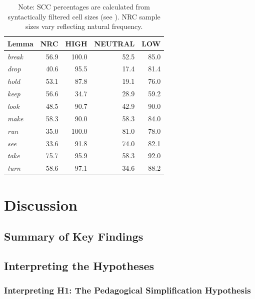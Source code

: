 \documentclass[11pt,a4paper]{article}
\begin{document}
\blindtext

\begin{table}[H]
\centering
\caption[Lemma-Level Idiomaticity]{Lemma-level idiomaticity across NRC and SCC conditions (\% \texttt{IDIOMATIC})}
\label{tab:results-lemma-level}
\begin{tabular}{lrrrr}
\toprule
\textbf{Lemma} & \textbf{NRC} & \textbf{HIGH} & \textbf{NEUTRAL} & \textbf{LOW} \\
\midrule
\textit{break} & 56.9 & 100.0 & 52.5 & 85.0 \\
\textit{drop} & 40.6 & 95.5 & 17.4 & 81.4 \\
\textit{hold} & 53.1 & 87.8 & 19.1 & 76.0 \\
\textit{keep} & 56.6 & 34.7 & 28.9 & 59.2 \\
\textit{look} & 48.5 & 90.7 & 42.9 & 90.0 \\
\textit{make} & 58.3 & 90.0 & 58.3 & 84.0 \\
\textit{run} & 35.0 & 100.0 & 81.0 & 78.0 \\
\textit{see} & 33.6 & 91.8 & 74.0 & 82.1 \\
\textit{take} & 75.7 & 95.9 & 58.3 & 92.0 \\
\textit{turn} & 58.6 & 97.1 & 34.6 & 88.2 \\
\bottomrule
\end{tabular}
\caption*{Note: SCC percentages are calculated from syntactically filtered cell sizes (see ). NRC sample sizes vary reflecting natural frequency.}
\end{table}

\section{Discussion}\label{sec:discussion}

\subsection{Summary of Key Findings}\label{subsec:key-findings}

\blindtext

\subsection{Interpreting the Hypotheses}\label{subsec:interpret-hypotheses}

\subsubsection{Interpreting H1: The Pedagogical Simplification Hypothesis}\label{subsubsec:interpret-h1}
\end{document}
